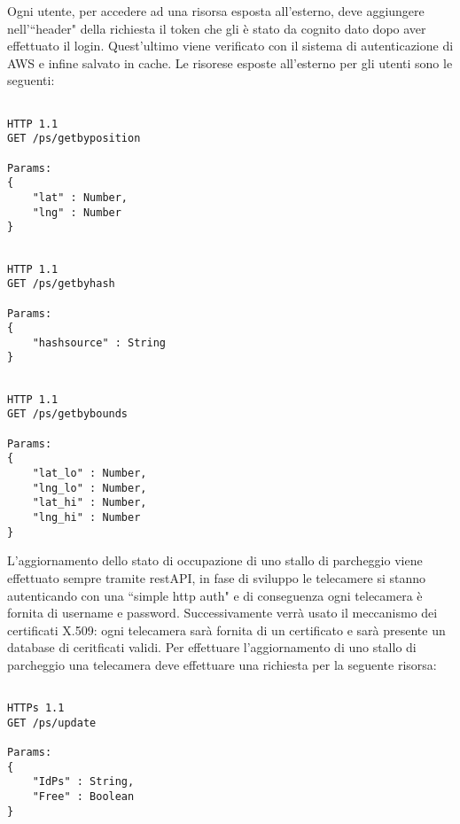 \vspace{0.5truecm}
Ogni utente, per accedere ad una risorsa esposta all'esterno, deve aggiungere nell'``header" della richiesta il token che gli è stato da cognito dato dopo aver effettuato il login. Quest'ultimo viene verificato con il sistema di autenticazione di AWS e infine salvato in cache. Le risorese esposte all'esterno per gli utenti sono le seguenti:

\lstset{language=HTTP}          

\begin{lstlisting}[frame=single]

HTTP 1.1 
GET /ps/getbyposition

Params:
{
	"lat" : Number,
	"lng" : Number
}

\end{lstlisting}

\vspace{1truecm}
\begin{lstlisting}[frame=single]

HTTP 1.1 
GET /ps/getbyhash

Params:
{
	"hashsource" : String
}

\end{lstlisting}


\begin{lstlisting}[frame=single]

HTTP 1.1 
GET /ps/getbybounds

Params:
{
	"lat_lo" : Number,
	"lng_lo" : Number,
	"lat_hi" : Number,
	"lng_hi" : Number
}

\end{lstlisting}

L'aggiornamento dello stato di occupazione di uno stallo di parcheggio viene effettuato sempre tramite restAPI, in fase di sviluppo le telecamere si stanno autenticando con una ``simple http auth" e di conseguenza ogni telecamera è fornita di username e password. Successivamente verrà usato il meccanismo dei certificati X.509: ogni telecamera sarà fornita di un certificato e sarà presente un database di ceritficati validi.
Per effettuare l'aggiornamento di uno stallo di parcheggio una telecamera deve effettuare una richiesta per la seguente risorsa:


\begin{lstlisting}[frame=single]

HTTPs 1.1 
GET /ps/update

Params:
{
	"IdPs" : String,
	"Free" : Boolean
}

\end{lstlisting}

